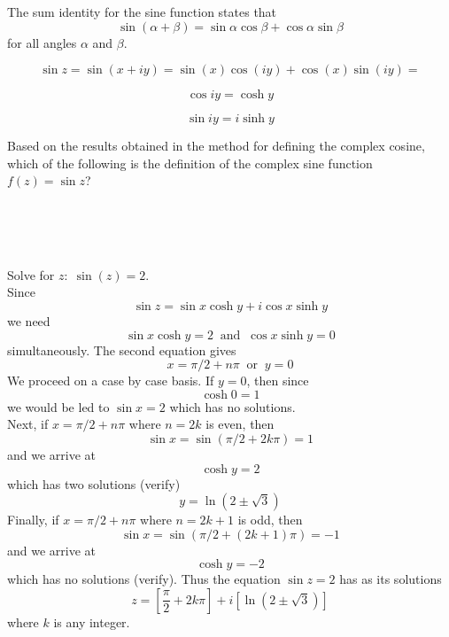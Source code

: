 \documentclass[handout]{ximera}
\begin{document}
\begin{question}
The sum identity for the sine function states that
\[
\sin(\alpha + \beta) = \sin \alpha \cos \beta + \cos \alpha \sin \beta
\]
for all angles $\alpha$ and $\beta$.

\begin{hint}
\[
\sin{z} = \sin(x+iy) = \sin(x) \cos(iy) + \cos(x) \sin(iy) =
\]
\end{hint}
\begin{hint}
\[
 \cos iy = \cosh y
\]
\end{hint}
\begin{hint}
\[
\sin iy = i \sinh y
\]
\end{hint}


Based on the results obtained in the method for defining the complex cosine, which of the following is the definition 
of the complex sine function $f(z) = \sin z$?
\begin{multipleChoice}
\\
\\
\\
\end{multipleChoice}
\end{question}


\begin{example}[example 1]
Solve for $z: \; \sin(z) = 2$.\\
Since
\[
\sin z = \sin x \cosh y + i\cos x \sinh y
\]
we need 
\[
\sin x \cosh y =2 \;\; \mbox{and} \;\; \cos x \sinh y = 0
\]
simultaneously. The second equation gives
\[
x = \pi/2 + n\pi \;\; \mbox{or} \;\; y = 0
\]
We proceed on a case by case basis. If $y = 0$, then since
\[
\cosh 0 = 1
\]
we would be led to $\sin x = 2$ which has no solutions.\\
Next, if $x = \pi/2 + n\pi$ where $n=2k$ is even, then 
\[
\sin x = \sin\left(\pi/2 + 2k\pi\right) = 1
\]
and we arrive at 
\[
\cosh y = 2
\]
which has two solutions (verify)
\[
y = \ln\left(2\pm \sqrt 3 \right)
\]
Finally, if $x = \pi/2 + n\pi$ where $n=2k+1$ is odd, then 
\[
\sin x = \sin\left(\pi/2 + (2k+1)\pi\right) = -1
\]
and we arrive at 
\[
\cosh y = -2
\]
which has no solutions (verify).
Thus the equation $\sin z = 2$ has as its solutions
\[
z = \left[\frac{\pi}{2} + 2k\pi\right] + i\left[\ln\left(2\pm \sqrt 3\right)\right]
\]
where $k$ is any integer.
\end{example}
\end{document}
